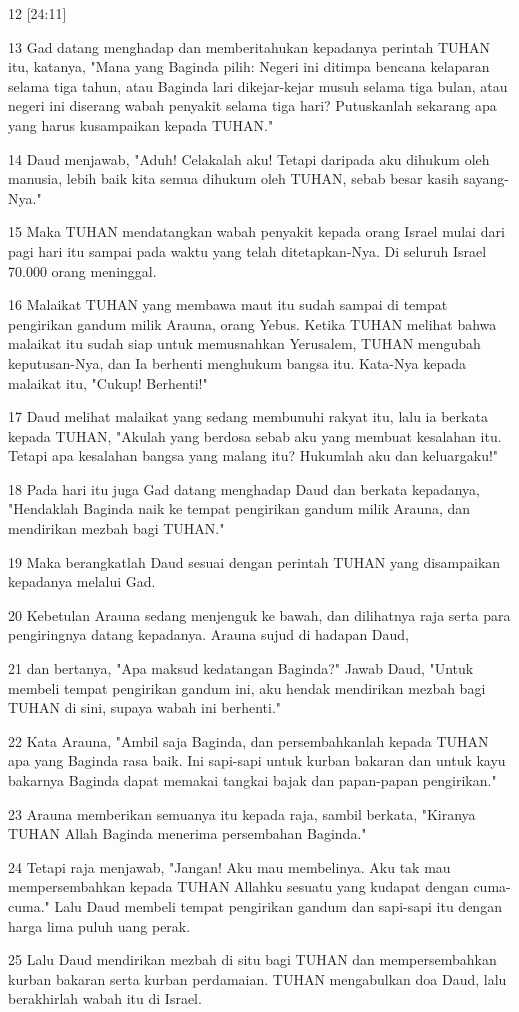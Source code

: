 \par 12 [24:11]
\par 13 Gad datang menghadap dan memberitahukan kepadanya perintah TUHAN itu, katanya, "Mana yang Baginda pilih: Negeri ini ditimpa bencana kelaparan selama tiga tahun, atau Baginda lari dikejar-kejar musuh selama tiga bulan, atau negeri ini diserang wabah penyakit selama tiga hari? Putuskanlah sekarang apa yang harus kusampaikan kepada TUHAN."
\par 14 Daud menjawab, "Aduh! Celakalah aku! Tetapi daripada aku dihukum oleh manusia, lebih baik kita semua dihukum oleh TUHAN, sebab besar kasih sayang-Nya."
\par 15 Maka TUHAN mendatangkan wabah penyakit kepada orang Israel mulai dari pagi hari itu sampai pada waktu yang telah ditetapkan-Nya. Di seluruh Israel 70.000 orang meninggal.
\par 16 Malaikat TUHAN yang membawa maut itu sudah sampai di tempat pengirikan gandum milik Arauna, orang Yebus. Ketika TUHAN melihat bahwa malaikat itu sudah siap untuk memusnahkan Yerusalem, TUHAN mengubah keputusan-Nya, dan Ia berhenti menghukum bangsa itu. Kata-Nya kepada malaikat itu, "Cukup! Berhenti!"
\par 17 Daud melihat malaikat yang sedang membunuhi rakyat itu, lalu ia berkata kepada TUHAN, "Akulah yang berdosa sebab aku yang membuat kesalahan itu. Tetapi apa kesalahan bangsa yang malang itu? Hukumlah aku dan keluargaku!"
\par 18 Pada hari itu juga Gad datang menghadap Daud dan berkata kepadanya, "Hendaklah Baginda naik ke tempat pengirikan gandum milik Arauna, dan mendirikan mezbah bagi TUHAN."
\par 19 Maka berangkatlah Daud sesuai dengan perintah TUHAN yang disampaikan kepadanya melalui Gad.
\par 20 Kebetulan Arauna sedang menjenguk ke bawah, dan dilihatnya raja serta para pengiringnya datang kepadanya. Arauna sujud di hadapan Daud,
\par 21 dan bertanya, "Apa maksud kedatangan Baginda?" Jawab Daud, "Untuk membeli tempat pengirikan gandum ini, aku hendak mendirikan mezbah bagi TUHAN di sini, supaya wabah ini berhenti."
\par 22 Kata Arauna, "Ambil saja Baginda, dan persembahkanlah kepada TUHAN apa yang Baginda rasa baik. Ini sapi-sapi untuk kurban bakaran dan untuk kayu bakarnya Baginda dapat memakai tangkai bajak dan papan-papan pengirikan."
\par 23 Arauna memberikan semuanya itu kepada raja, sambil berkata, "Kiranya TUHAN Allah Baginda menerima persembahan Baginda."
\par 24 Tetapi raja menjawab, "Jangan! Aku mau membelinya. Aku tak mau mempersembahkan kepada TUHAN Allahku sesuatu yang kudapat dengan cuma-cuma." Lalu Daud membeli tempat pengirikan gandum dan sapi-sapi itu dengan harga lima puluh uang perak.
\par 25 Lalu Daud mendirikan mezbah di situ bagi TUHAN dan mempersembahkan kurban bakaran serta kurban perdamaian. TUHAN mengabulkan doa Daud, lalu berakhirlah wabah itu di Israel.


